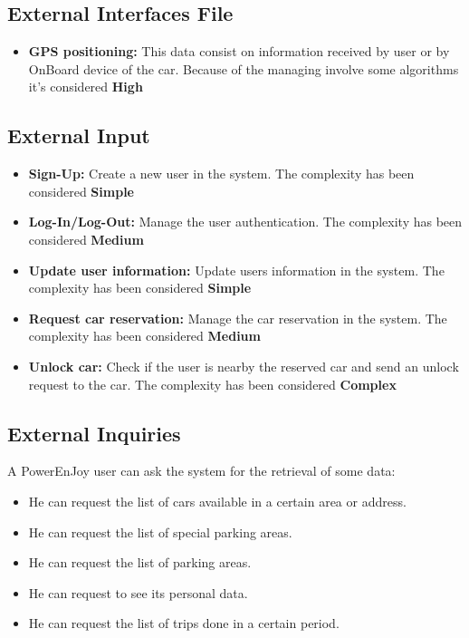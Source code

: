 \subsection{External Interfaces File} %

\begin{itemize}
	\item \textbf{GPS positioning:} This data consist on information received by user or by OnBoard device of the car. Because of the managing involve some algorithms it's considered \textbf{High}
\end{itemize}


\subsection{External Input} %
\begin{itemize}
	\item \textbf{Sign-Up:} Create a new user in the system. The complexity has been considered \textbf{Simple}
	\item \textbf{Log-In/Log-Out:} Manage the user authentication. The complexity has been considered \textbf{Medium}
	\item \textbf{Update user information:} Update users information in the system. The complexity has been considered \textbf{Simple}
	\item \textbf{Request car reservation:} Manage the car reservation in the system. The complexity has been considered \textbf{Medium}
	\item \textbf{Unlock car:} Check if the user is nearby the reserved car and send an unlock request to the car. The complexity has been considered \textbf{Complex}
\end{itemize}


\subsection{External Inquiries} %
A PowerEnJoy user can ask the system for the retrieval of some data:
\begin{itemize}
\item He can request the list of cars available in a certain area or address.
\item He can request the list of special parking areas.
\item He can request the list of parking areas.
\item He can request to see its personal data.
\item He can request the list of trips done in a certain period.
\end{itemize}
